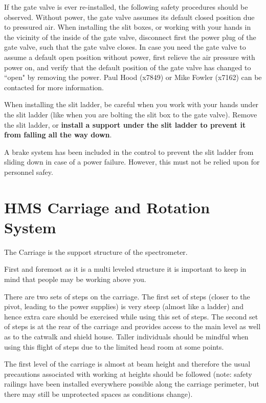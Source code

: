 If the gate valve is ever re-installed, the following safety
procedures should be observed.  Without power, the gate valve assumes its default closed position due to
pressured air. When installing the slit boxes, or working with your hands
in the vicinity of the inside of the gate valve, disconnect first the power
plug of the gate valve, such that the gate valve closes.
In case you need the gate valve to assume a default open position without
power, first relieve the air pressure
with power on, and verify that the default position of the gate valve has
changed to ``open" by removing the power. Paul Hood (x7849) or Mike Fowler
(x7162) can be contacted for more information.

When installing the slit ladder, be careful when you work with your hands
under the slit ladder (like when you are bolting the slit box to the
gate valve). Remove the slit ladder, or {\bf install a support under the slit
ladder to prevent it from falling all the way down}.

A brake system has been included in the control to prevent the slit ladder
from sliding down in case of a power failure.  However, this must not
be relied upon for personnel safey.


\section{HMS Carriage and Rotation System }

	The Carriage is the support structure of the spectrometer.

First and foremost as it is a multi leveled structure it is important to keep in
mind that people may be working above you. 

There are two sets of steps on the carriage. The first set of steps
(closer to the pivot, leading to the power supplies) is very
steep (almost like a ladder) and hence extra care should be exercised
while using this set of steps. The second set of steps is at the rear
of the carriage and provides access to the main level as well as to
the catwalk and shield house. Taller individuals should be mindful
when using this flight of steps due to the limited head room at some 
points.

The first level of the carriage is almost at beam height and therefore
the usual precautions associated with working at heights should be followed (note:
safety railings have been installed everywhere possible along the carriage
perimeter, but there may still be unprotected spaces as conditions change).

